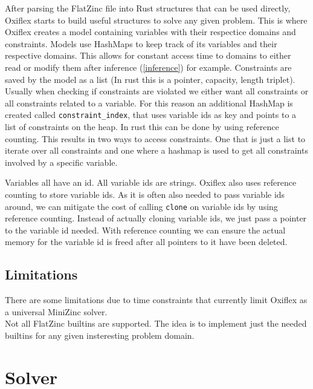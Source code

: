After parsing the FlatZinc file into Rust structures that can be used directly, Oxiflex starts to build useful structures  to solve any given problem. This is where Oxiflex creates a model containing variables with their respectice domains and constraints. Models use HashMaps to keep track of its variables and their respective domains. This allows for constant access time to domains to either read or modify them after inference (\ref{inference}) for example. Constraints are saved by the model as a list (In rust this is a pointer, capacity, length triplet). Usually when checking if constraints are violated we either want all constraints or all constraints related to a variable. For this reason an additional HashMap is created called \verb|constraint_index|, that uses variable ids as key and points to a list of constraints on the heap. In rust this can be done by using reference counting. This results in two ways to access constraints. One that is just a list to iterate over all constraints and one where a hashmap is used to get all constraints involved by a specific variable.

Variables all have an id. All variable ids are strings. Oxiflex also uses reference counting to store variable ids. As it is often also needed to pass variable ids around, we can mitigate the cost of calling \verb|clone| on variable ids by using reference counting. Instead of actually cloning variable ids, we just pass a pointer to the variable id needed. With reference counting we can ensure the actual memory for the variable id is freed after all pointers to it have been deleted.

\subsection{Limitations}

There are some limitations due to time constraints that currently limit Oxiflex as a universal MiniZinc solver. \\

Not all FlatZinc builtins are supported. The idea is to implement just the needed builtins for any given insteresting problem domain.



\section{Solver}

